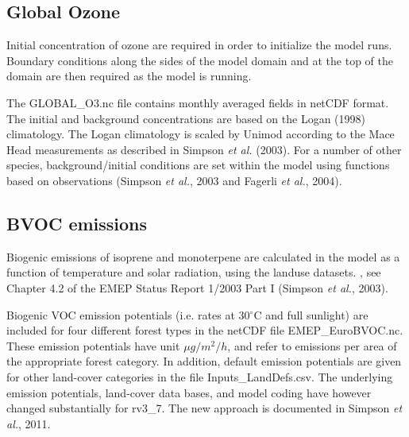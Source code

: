 \subsection{Global Ozone}

Initial concentration of ozone are required in order to
initialize the model runs. Boundary conditions along the sides of the model
domain and at the top of the domain are then required as the model is
running.

The GLOBAL\_O3.nc file contains monthly averaged fields in netCDF format. 
The initial and background
concentrations are based on the Logan (1998) climatology. The Logan
climatology is scaled by Unimod according to the Mace Head measurements as
described in Simpson {\sl et al.} (2003). For a number of other species, 
background/initial conditions are set within the model using functions 
based on observations (Simpson {\sl et al.}, 2003 and Fagerli {\sl et al.}, 2004).



\subsection{BVOC emissions}

Biogenic emissions of isoprene and monoterpene are calculated in the
model as a function of temperature and solar radiation, using the landuse
datasets. , see 
Chapter 4.2 of the EMEP Status Report 1/2003 Part I (Simpson
{\sl et al.}, 2003).

Biogenic VOC emission potentials (i.e. rates at 30$^\circ$C and full sunlight)
are included for four different forest types in the netCDF file 
EMEP\_EuroBVOC.nc. These emission potentials have unit $\mu g/m^{2} /h$, and
refer to emissions per area of the appropriate forest category. In 
addition, default emission potentials are given for other
land-cover categories in the file Inputs\_LandDefs.csv. 
The underlying emission potentials, land-cover data bases, and model
coding have however changed substantially for rv3\_7. The new approach
is documented in Simpson {\sl et al.}, 2011.






